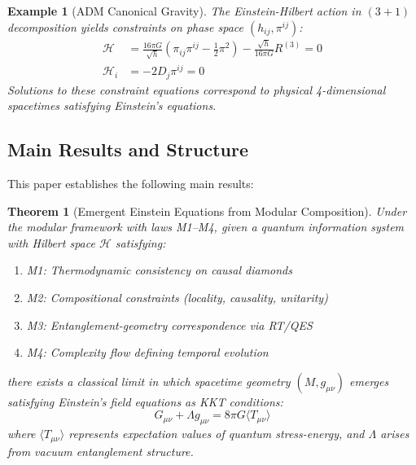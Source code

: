 \documentclass[11pt,a4paper]{article}
\newtheorem{theorem}{Theorem}[section]
\newtheorem{example}{Example}[section]
\theoremstyle{remark}
\theoremstyle{definition}
\begin{document}
\begin{example}[ADM Canonical Gravity]
The Einstein-Hilbert action in $(3+1)$ decomposition yields constraints on phase space $(h_{ij}, \pi^{ij})$:
\begin{align}
\mathcal{H} &= \frac{16\pi G}{\sqrt{h}}\left(\pi_{ij}\pi^{ij} - \frac{1}{2}\pi^2\right) - \frac{\sqrt{h}}{16\pi G}R^{(3)} = 0 \\
\mathcal{H}_i &= -2 D_j \pi^{ij} = 0
\end{align}
Solutions to these constraint equations correspond to physical 4-dimensional spacetimes satisfying Einstein's equations.
\end{example}

\subsection{Main Results and Structure}

This paper establishes the following main results:

\begin{theorem}[Emergent Einstein Equations from Modular Composition]
\label{thm:emergent_einstein}
Under the modular framework with laws M1--M4, given a quantum information system with Hilbert space $\mathcal{H}$ satisfying:
\begin{enumerate}[label=(\roman*)]
\item M1: Thermodynamic consistency on causal diamonds
\item M2: Compositional constraints (locality, causality, unitarity)
\item M3: Entanglement-geometry correspondence via RT/QES
\item M4: Complexity flow defining temporal evolution
\end{enumerate}
there exists a classical limit in which spacetime geometry $(M, g_{\mu\nu})$ emerges satisfying Einstein's field equations as KKT conditions:
\begin{equation}
G_{\mu\nu} + \Lambda g_{\mu\nu} = 8\pi G \langle T_{\mu\nu} \rangle
\end{equation}
where $\langle T_{\mu\nu} \rangle$ represents expectation values of quantum stress-energy, and $\Lambda$ arises from vacuum entanglement structure.
\end{theorem}
\end{document}
